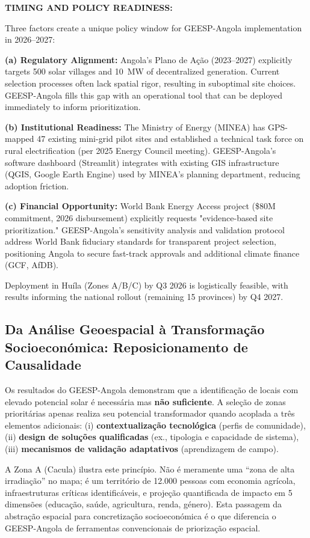 \documentclass[12pt, a4paper]{article}
\begin{document}
\noindent\textbf{TIMING AND POLICY READINESS:}

Three factors create a unique policy window for GEESP-Angola implementation in 2026--2027:

\textbf{(a) Regulatory Alignment:} Angola's Plano de Ação (2023--2027) explicitly targets 500 solar villages and 10~MW of decentralized generation. Current selection processes often lack spatial rigor, resulting in suboptimal site choices. GEESP-Angola fills this gap with an operational tool that can be deployed immediately to inform prioritization.

\textbf{(b) Institutional Readiness:} The Ministry of Energy (MINEA) has GPS-mapped 47 existing mini-grid pilot sites and established a technical task force on rural electrification (per 2025 Energy Council meeting). GEESP-Angola's software dashboard (Streamlit) integrates with existing GIS infrastructure (QGIS, Google Earth Engine) used by MINEA's planning department, reducing adoption friction.

\textbf{(c) Financial Opportunity:} World Bank Energy Access project (\$80M commitment, 2026 disbursement) explicitly requests "evidence-based site prioritization." GEESP-Angola's sensitivity analysis and validation protocol address World Bank fiduciary standards for transparent project selection, positioning Angola to secure fast-track approvals and additional climate finance (GCF, AfDB).

Deployment in Huíla (Zones A/B/C) by Q3 2026 is logistically feasible, with results informing the national rollout (remaining 15 provinces) by Q4 2027.

\subsection{Da Análise Geoespacial à Transformação Socioeconómica: Reposicionamento de Causalidade}

Os resultados do GEESP-Angola demonstram que a identificação de locais com elevado 
potencial solar é necessária mas \textbf{não suficiente}. A seleção de zonas prioritárias 
apenas realiza seu potencial transformador quando acoplada a três elementos adicionais: (i) \textbf{contextualização tecnológica} (perfis de comunidade), (ii) \textbf{design de soluções qualificadas} (ex., tipologia e capacidade de sistema), (iii) \textbf{mecanismos de validação adaptativos} (aprendizagem de campo).

A Zona A (Cacula) ilustra este princípio. Não é meramente uma ``zona de alta irradiação'' 
no mapa; é um território de 12.000 pessoas com economia agrícola, infraestruturas críticas 
identificáveis, e projeção quantificada de impacto em 5 dimensões (educação, saúde, 
agricultura, renda, género). Esta passagem da abstração espacial para concretização 
socioeconómica é o que diferencia o GEESP-Angola de ferramentas convencionais de 
priorização espacial.
\end{document}
